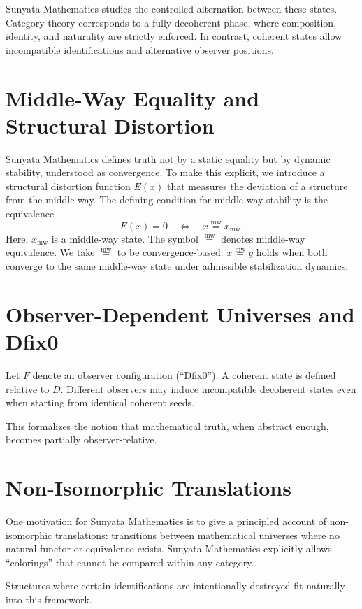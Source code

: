 \documentclass[11pt]{article}
\newcommand{\mweq}{\mathrel{\overset{\mathrm{mw}}{=}}}
\begin{document}
Sunyata Mathematics studies the controlled alternation between these states. Category theory corresponds to a fully decoherent phase, where composition, identity, and naturality are strictly enforced. In contrast, coherent states allow incompatible identifications and alternative observer positions.

\section{Middle-Way Equality and Structural Distortion}
Sunyata Mathematics defines truth not by a static equality but by dynamic stability, understood as convergence.
To make this explicit, we introduce a structural distortion function $E(x)$ that measures the deviation of a structure from the middle way.
The defining condition for middle-way stability is the equivalence
\[
E(x) = 0 \quad \Longleftrightarrow \quad x \mweq x_{\mathrm{mw}}.
\]
Here, $x_{\mathrm{mw}}$ is a middle-way state. The symbol $\mweq$ denotes middle-way equivalence.
We take $\mweq$ to be convergence-based: $x \mweq y$ holds when both converge to the same
middle-way state under admissible stabilization dynamics.

\section{Observer-Dependent Universes and Dfix0}
Let $F$ denote an observer configuration (``Dfix0''). A coherent state is defined relative to $D$.
Different observers may induce incompatible decoherent states even when starting from identical coherent seeds.

This formalizes the notion that mathematical truth, when abstract enough, becomes partially observer-relative.

\section{Non-Isomorphic Translations}
One motivation for Sunyata Mathematics is to give a principled account of non-isomorphic translations:
transitions between mathematical universes where no natural functor or equivalence exists.
Sunyata Mathematics explicitly allows ``colorings'' that cannot be compared within any category.

Structures where certain identifications are intentionally destroyed fit naturally into this framework.
\end{document}
